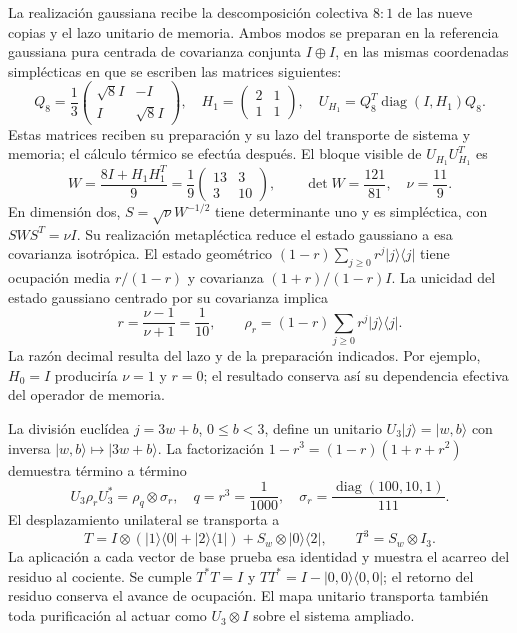 La realización gaussiana recibe la descomposición colectiva $8:1$ de
las nueve copias y el lazo unitario de memoria. Ambos modos se preparan
en la referencia gaussiana pura centrada de covarianza conjunta $I\oplus I$,
en las mismas coordenadas simplécticas en que se escriben las matrices
siguientes:
\[
 Q_8=\frac13\begin{pmatrix}\sqrt8 I&-I\\ I&\sqrt8 I\end{pmatrix},
 \quad H_1=\begin{pmatrix}2&1\\1&1\end{pmatrix},
 \quad U_{H_1}=Q_8^T\operatorname{diag}(I,H_1)Q_8.
\]
Estas matrices reciben su preparación y su lazo del transporte de
sistema y memoria; el cálculo térmico se efectúa después. El bloque
visible de $U_{H_1}U_{H_1}^T$ es
\[
 W=\frac{8I+H_1H_1^T}{9}
 =\frac19\begin{pmatrix}13&3\\3&10\end{pmatrix},
 \qquad \det W=\frac{121}{81},\quad \nu=\frac{11}{9}.
\]
En dimensión dos, $S=\sqrt\nu W^{-1/2}$ tiene determinante uno y es
simpléctica, con $SWS^T=\nu I$. Su realización metapléctica reduce el
estado gaussiano a esa covarianza isotrópica. El estado geométrico
$(1-r)\sum_{j\geq0}r^j|j\rangle\langle j|$ tiene ocupación media
$r/(1-r)$ y covarianza $(1+r)/(1-r)I$. La unicidad del estado gaussiano
centrado por su covarianza implica
\begin{equation}
 r=\frac{\nu-1}{\nu+1}=\frac1{10},\qquad
 \rho_r=(1-r)\sum_{j\geq0}r^j|j\rangle\langle j|.
 \label{eq:ii-ter27-williamson}
\end{equation}
La razón decimal resulta del lazo y de la preparación indicados. Por
ejemplo, $H_0=I$ produciría $\nu=1$ y $r=0$; el resultado conserva
así su dependencia efectiva del operador de memoria.

La división euclídea $j=3w+b$, $0\leq b<3$, define un unitario
$U_3|j\rangle=|w,b\rangle$ con inversa $|w,b\rangle\mapsto|3w+b\rangle$.
La factorización $1-r^3=(1-r)(1+r+r^2)$ demuestra término a término
\begin{equation}
 U_3\rho_rU_3^*=\rho_q\otimes\sigma_r,
 \quad q=r^3=\frac1{1000},\quad
 \sigma_r=\frac{\operatorname{diag}(100,10,1)}{111}.
 \label{eq:ii-ter27-agrupamiento}
\end{equation}
El desplazamiento unilateral se transporta a
\[
 T=I\otimes(|1\rangle\langle0|+|2\rangle\langle1|)
       +S_w\otimes|0\rangle\langle2|,\qquad T^3=S_w\otimes I_3.
\]
La aplicación a cada vector de base prueba esa identidad y muestra el
acarreo del residuo al cociente. Se cumple $T^*T=I$ y
$TT^*=I-|0,0\rangle\langle0,0|$; el retorno del residuo conserva el
avance de ocupación. El mapa unitario transporta también toda purificación
al actuar como $U_3\otimes I$ sobre el sistema ampliado.

